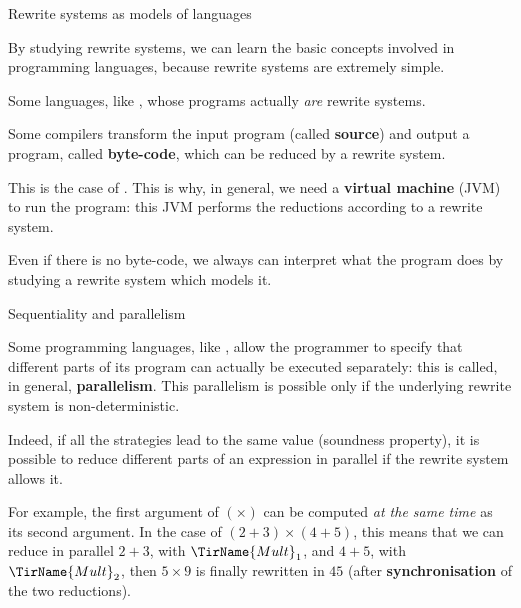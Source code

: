 %
\begin{frame}{Rewrite systems as models of languages}

  By studying rewrite systems, we can learn the basic concepts
  involved in programming languages, because rewrite systems are
  extremely simple.

  \bigskip

  Some languages, like \Maude, whose programs actually \emph{are}
  rewrite systems.

  \bigskip

  Some compilers transform the input program (called \textbf{source})
  and output a program, called \textbf{byte-code}, which can be
  reduced by a rewrite system.

  \bigskip

  This is the case of \Java. This is why, in general, we need a
  \textbf{\Java virtual machine} (JVM) to run the program: this JVM
  performs the reductions according to a rewrite system.

  \bigskip

  Even if there is no byte-code, we always can interpret what the
  program does by studying a rewrite system which models it.

\end{frame}

%
\begin{frame}{Sequentiality and parallelism}

  Some programming languages, like \Ada, allow the programmer to
  specify that different parts of its program can actually be executed
  separately: this is called, in general, \textbf{parallelism}. This
  parallelism is possible only if the underlying rewrite system is
  non-deterministic.

  \bigskip

  Indeed, if all the strategies lead to the same value (soundness
  property), it is possible to reduce different parts of an expression
  in parallel if the rewrite system allows it.

  \bigskip

  For example, the first argument of \((\times)\) can be computed
  \emph{at the same time} as its second argument. In the case of
  \((2+3) \times (4+5)\), this means that we can reduce in parallel
  \(2+3\), with \(\TirName{Mult}_1\), and \(4+5\), with
  \(\TirName{Mult}_2\), then \(5 \times 9\) is finally rewritten in
  \(45\) (after \textbf{synchronisation} of the two reductions).

\end{frame}

